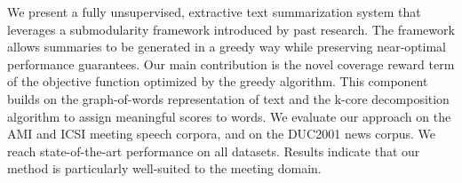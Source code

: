 We present a fully unsupervised, extractive text summarization system that leverages a submodularity framework introduced by past research. The framework allows summaries to be generated in a greedy way while preserving near-optimal performance guarantees. Our main contribution is the novel coverage reward term of the objective function optimized by the greedy algorithm. This component builds on the graph-of-words representation of text and the k-core decomposition algorithm to assign meaningful scores to words. We evaluate our approach on the AMI and ICSI meeting speech corpora, and on the DUC2001 news corpus. We reach state-of-the-art performance on all datasets. Results indicate that our method is particularly well-suited to the meeting domain.
